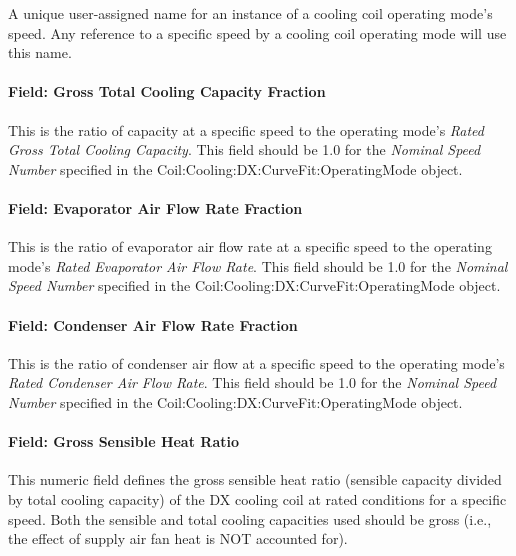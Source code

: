 A unique user-assigned name for an instance of a cooling coil operating mode's speed. Any reference to a specific speed by a cooling coil operating mode will use this name.

\paragraph{Field: Gross Total Cooling Capacity Fraction}\label{field-gross-total-cooling-capacity-fraction}

This is the ratio of capacity at a specific speed to the operating mode's \textit{Rated Gross Total Cooling Capacity}. This field should be 1.0 for the \textit{Nominal Speed Number} specified in the Coil:Cooling:DX:CurveFit:OperatingMode object.

\paragraph{Field: Evaporator Air Flow Rate Fraction}\label{field-evaporator-air-flow-rate-fraction}

This is the ratio of evaporator air flow rate at a specific speed to the operating mode's \textit{Rated Evaporator Air Flow Rate}. This field should be 1.0 for the \textit{Nominal Speed Number} specified in the Coil:Cooling:DX:CurveFit:OperatingMode object.

\paragraph{Field: Condenser Air Flow Rate Fraction}\label{field-condenser-air-flow-rate-fraction}

This is the ratio of condenser air flow at a specific speed to the operating mode's \textit{Rated Condenser Air Flow Rate}. This field should be 1.0 for the \textit{Nominal Speed Number} specified in the Coil:Cooling:DX:CurveFit:OperatingMode object.

\paragraph{Field: Gross Sensible Heat Ratio}\label{field-gross-sensible-heat-ratio}

This numeric field defines the gross sensible heat ratio (sensible capacity divided by total cooling capacity) of the DX cooling coil at rated conditions for a specific speed. Both the sensible and total cooling capacities used should be gross (i.e., the effect of supply air fan heat is NOT accounted for).

